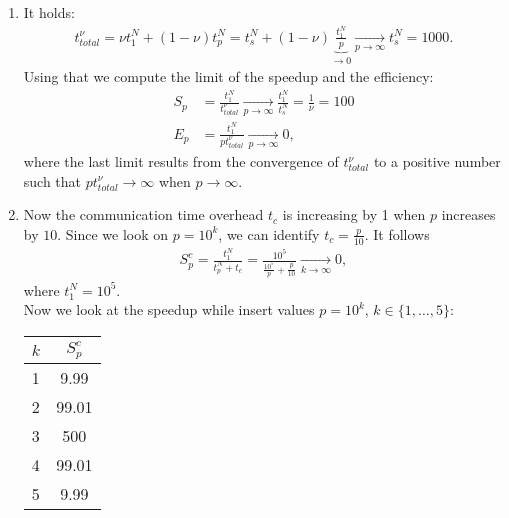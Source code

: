 \documentclass{article}
\begin{document}
\begin{enumerate}[label=(\alph*)]
\item It holds: 
\begin{align*}
    t^{\nu}_{total} = \nu t_1^N + (1-\nu)t_p^N = t_s^N + (1-\nu)\underbrace{\frac{t_1^N}{p}}_{\to 0} \xrightarrow[p \to \infty]{} t_s^N=1000.
\end{align*}
Using that we compute the limit of the speedup and the efficiency:
\begin{align*}
    S_p &= \frac{t_1^N}{t_{total}^\nu}\xrightarrow[p \to \infty]{} \frac{t_1^N}{t_s^N}=\frac{1}{\nu}=100\\
    E_p &= \frac{t_1^N}{pt_{total}^\nu}\xrightarrow[p \to \infty]{}0,
\end{align*}
where the last limit results from the convergence of $t^\nu_{total}$ to a positive number such that $pt^\nu_{total}\to\infty$ when $p\to\infty$.
\item Now the communication time overhead $t_c$ is increasing by 1 when $p$ increases by $10$. Since we look on $p=10^k$, we can identify $t_c=\frac{p}{10}$.
It follows
\begin{align*}
    S^c_p = \frac{t_1^N}{t_p^N+t_c} = \frac{10^5}{\frac{10^5}{p} + \frac{p}{10}} \xrightarrow[k \to \infty]{} 0,
\end{align*}
where $t_1^N = 10^5$.\\
Now we look at the speedup while insert values $p=10^k$, $k\in\{1,\dots,5\}$:
    \begin{center}
\begin{tabular}{ l | c } 
  $k$ & $S_p^c$ \\
  \hline
  1 & 9.99 \\
  2 & 99.01 \\
  3 & 500 \\
  4 & 99.01 \\
  5 & 9.99 \\
\end{tabular}        
    \end{center}
\end{enumerate}
\end{document}
